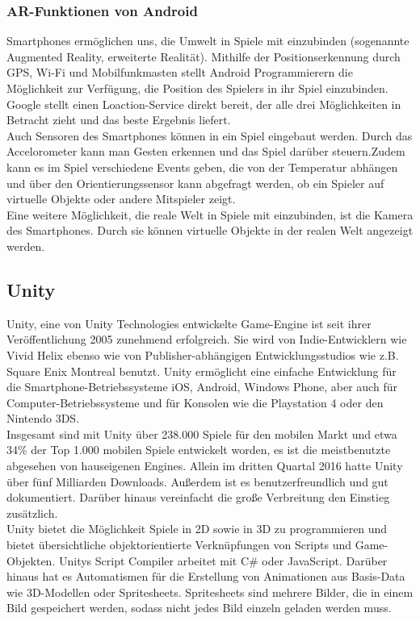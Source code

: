 \documentclass[extern,palatino]{cgBA}
\begin{document}
\subsubsection{AR-Funktionen von Android}
Smartphones ermöglichen uns, die Umwelt in Spiele mit einzubinden (sogenannte Augmented Reality, erweiterte Realität). Mithilfe der Positionserkennung durch GPS, Wi-Fi und Mobilfunkmasten stellt Android Programmierern die Möglichkeit zur Verfügung, die Position des Spielers in ihr Spiel einzubinden. Google stellt einen Loaction-Service direkt bereit\cite{and3}, der alle drei Möglichkeiten in Betracht zieht und das beste Ergebnis liefert.\\
Auch Sensoren des Smartphones können in ein Spiel eingebaut werden. Durch das Accelorometer kann man Gesten erkennen und das Spiel darüber steuern.Zudem kann es im Spiel verschiedene Events geben, die von der Temperatur abhängen und über den Orientierungssensor kann abgefragt werden, ob ein Spieler auf virtuelle Objekte oder andere Mitspieler zeigt.\\
Eine weitere Möglichkeit, die reale Welt in Spiele mit einzubinden, ist die Kamera des Smartphones. Durch sie können virtuelle Objekte in der realen Welt angezeigt werden. 
\newpage
\subsection{Unity}
Unity, eine von Unity Technologies entwickelte Game-Engine ist seit ihrer Veröffentlichung 2005 zunehmend erfolgreich. %
Sie wird von Indie-Entwicklern wie Vivid Helix\cite{unindie} ebenso wie von Publisher-abhängigen Entwicklungsstudios wie z.B. Square Enix Montreal\cite{unpubl} benutzt. Unity ermöglicht eine einfache Entwicklung für die Smartphone-Betriebssysteme iOS, Android, Windows Phone, aber auch für Computer-Betriebssysteme und für Konsolen wie die Playstation 4 oder den Nintendo 3DS\cite{unpub}.
\\Insgesamt sind mit Unity über 238.000 Spiele\cite{unblog} für den mobilen Markt 
und etwa 34\%\cite{unpub} der Top 1.000 mobilen Spiele entwickelt worden, es ist die meistbenutzte abgesehen von hauseigenen Engines. Allein im dritten Quartal 2016 hatte Unity über fünf Milliarden Downloads\cite{unpub}. Außerdem ist es benutzerfreundlich und gut dokumentiert. Darüber hinaus vereinfacht die große Verbreitung den Einstieg zusätzlich.
\\Unity bietet die Möglichkeit Spiele in 2D sowie in 3D zu programmieren\cite{un} und bietet übersichtliche objektorientierte Verknüpfungen von Scripts und Game-Objekten. Unitys Script Compiler arbeitet mit C\# oder JavaScript. Darüber hinaus hat es Automatismen für die Erstellung von Animationen aus Basis-Data wie 3D-Modellen oder Spritesheets. Spritesheets sind mehrere Bilder, die in einem Bild gespeichert werden, sodass nicht jedes Bild einzeln geladen werden muss.
\newpage 
\end{document}
